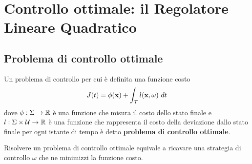 \section{Controllo ottimale: il Regolatore Lineare Quadratico} 
\label{sec:controllo-ottimale}
\subsection{Problema di controllo ottimale}
\begin{definition}
    Un problema di controllo per cui è definita una funzione costo
    \begin{equation*}
        J(t) = \phi(\mathbf{x}) + \int_{\mathcal T} l(\mathbf{x}, \omega) \ dt
    \end{equation*}
    dove $\phi : \Sigma \to \mathbb{R}$ è una funzione che misura il costo dello stato finale
    e $l : \Sigma \times \mathcal U \to \mathbb{R}$ è una funzione che rappresenta il costo
    della deviazione dallo stato finale per ogni istante di tempo
    è detto \textbf{problema di controllo ottimale}.
\end{definition}
Risolvere un problema di controllo ottimale equivale a ricavare una strategia
di controllo $\omega$ che ne minimizzi la funzione costo.

